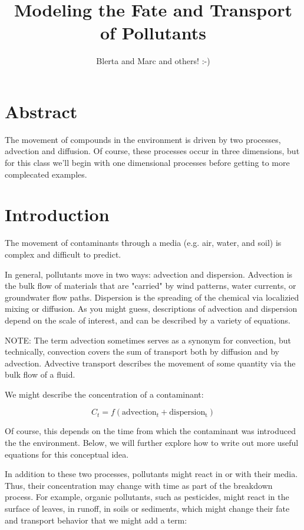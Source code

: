 \documentclass{tufte-handout}
\author{Blerta and Marc and others! :-)}
\title{Modeling the Fate and Transport of Pollutants}
\begin{document}

\maketitle

\section{Abstract}
\noindent The movement of compounds in the environment is driven by two processes, advection and diffusion. Of course, these processes occur in three dimensions, but for this class we'll begin with one dimensional processes before getting to more complecated examples.

\section{Introduction}

The movement of contaminants through a media (e.g. air, water, and soil) is complex and difficult to predict. 

In general, pollutants move in two ways: advection and dispersion. Advection is the bulk flow of materials that are "carried" by wind patterns, water currents, or groundwater flow paths. Dispersion is the spreading of the chemical via localizied mixing or diffusion. As you might guess, descriptions of advection and dispersion depend on the scale of interest, and can be described by a variety of equations.

NOTE: The term advection sometimes serves as a synonym for convection, but technically, convection covers the sum of transport both by diffusion and by advection. Advective transport describes the movement of some quantity via the bulk flow of a fluid.

We might describe the concentration of a contaminant:

\begin{equation}
C_t = f(\mathrm{advection}_t + \mathrm{dispersion_t})
\end{equation}

Of course, this depends on the time from which the contaminant was introduced the the environment. Below, we will further explore how to write out more useful equations for this conceptual idea.

In addition to these two processes, pollutants might react in or with their media. Thus, their concentration may change with time as part of the breakdown process. For example, organic pollutants, such as pesticides, might react in the surface of leaves, in runoff, in soils or sediments, which might change their fate and transport behavior that we might add a term: 
\end{document}
